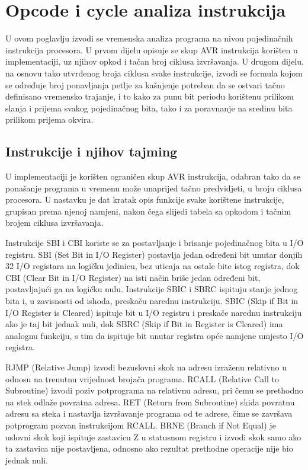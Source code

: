 %
%
\chapter{Opcode i cycle analiza instrukcija}
\label{chap:opcode}
U ovom poglavlju izvodi se vremenska analiza programa na nivou
pojedinačnih instrukcija procesora. U prvom dijelu opisuje se skup AVR
instrukcija korišten u implementaciji, uz njihov opkod i tačan broj
ciklusa izvršavanja. U
drugom dijelu, na osnovu tako utvrđenog broja ciklusa svake instrukcije,
izvodi se formula kojom se određuje broj ponavljanja petlje za kašnjenje
potreban da se ostvari tačno definisano vremensko trajanje, i to kako za
punu bit periodu korištenu prilikom slanja i prijema svakog pojedinačnog
bita, tako i za poravnanje na sredinu bita prilikom prijema okvira.
%
\section{Instrukcije i njihov tajming}
\label{sec:instructions}
%
U implementaciji je korišten ograničen skup AVR instrukcija, odabran tako
da se ponašanje programa u vremenu može unaprijed tačno predvidjeti, u
broju ciklusa procesora. U nastavku je dat kratak opis funkcije svake
korištene instrukcije, grupisan prema njenoj namjeni, nakon čega slijedi
tabela sa opkodom i tačnim brojem ciklusa
izvršavanja.

Instrukcije SBI i CBI koriste se za postavljanje i brisanje pojedinačnog
bita u I/O registru. SBI (\foreignlanguage{english}{Set Bit in I/O
Register}) postavlja jedan određeni bit unutar donjih 32 I/O registara na
logičku jedinicu, bez uticaja na ostale bite istog registra, dok CBI
(\foreignlanguage{english}{Clear Bit in I/O Register}) na isti način
briše jedan određeni bit, postavljajući ga na logičku nulu. Instrukcije
SBIC i SBRC ispituju stanje jednog bita i, u zavisnosti od ishoda,
preskaču narednu instrukciju. SBIC
(\foreignlanguage{english}{Skip if Bit in I/O Register is Cleared})
ispituje bit u I/O registru i preskače narednu instrukciju ako je taj
bit jednak nuli, dok SBRC
(\foreignlanguage{english}{Skip if Bit in Register is Cleared}) ima
analognu funkciju, s tim da ispituje bit unutar registra opće namjene
umjesto I/O registra.

RJMP (\foreignlanguage{english}{Relative Jump}) izvodi bezuslovni skok na
adresu izraženu relativno u odnosu na trenutnu vrijednost brojača
programa. RCALL (\foreignlanguage{english}{Relative Call to Subroutine})
izvodi poziv potprograma na relativnu adresu, pri čemu se prethodno na
stek odlaže povratna adresa. RET (\foreignlanguage{english}{Return from
Subroutine}) skida povratnu adresu sa steka i nastavlja izvršavanje
programa od te adrese, čime se završava potprogram pozvan instrukcijom
RCALL. BRNE (\foreignlanguage{english}{Branch if Not Equal}) je uslovni
skok koji ispituje zastavicu Z u statusnom registru i izvodi skok samo
ako ta zastavica nije postavljena, odnosno ako rezultat prethodne
operacije nije bio jednak nuli.


